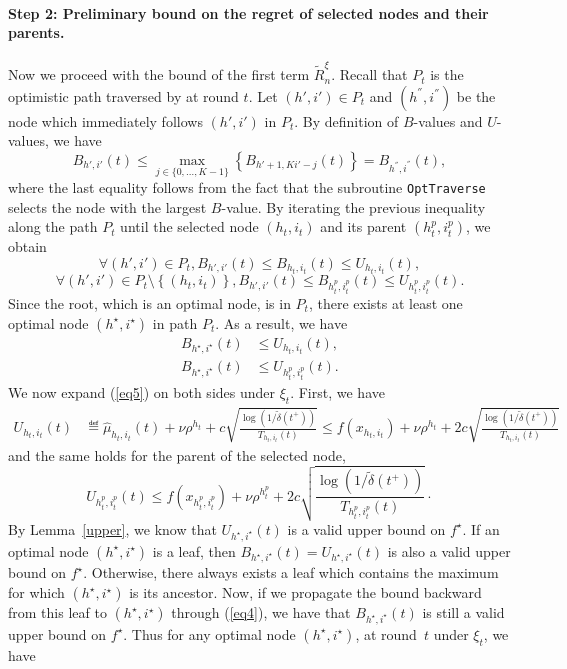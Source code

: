 \paragraph{Step 2: Preliminary bound on the regret of selected nodes and their parents.}
Now we proceed with the bound of the first term $\tilde{R}_n^{\xi}$.
Recall that $P_t$ is the optimistic path traversed by \HCT at round $t$.
Let $(h',i')\in P_t$ and $(h^{''},i^{''})$ be the node which immediately follows $(h',i')$ in $P_t$. By definition of $B$-values and $U$-values, we have
\begin{equation} \label{eq4}
B_{h',i'}(t) \leq \underset{j\in\{0,\ldots,K-1\}}{\max} \left\{B_{h'+1,Ki'-j}(t)\right\} = B_{h^{''},i^{''}}(t),
\end{equation}
where the last equality follows from the fact that the subroutine \texttt{OptTraverse} selects the node with the largest $B$-value. By iterating the previous inequality along  the path $P_t$ until the selected node $(h_t,i_t)$ and its parent $(h_t^p,i_t^p)$, we obtain
\[
\forall (h',i')\in P_t, B_{h',i'}(t) \leq B_{h_t,i_t}(t) \leq U_{h_t,i_t}(t),
\]
\[
\forall (h',i')\in P_t\setminus \left\{(h_t,i_t)\right\}, B_{h',i'}(t) \leq B_{h_t^p,i_t^p}(t) \leq U_{h_t^p,i_t^p}(t).
\]
Since the root, which is an optimal node, is in $P_t$, there exists at least one optimal node $(h^\star,i^\star)$ in path $P_t$. As a result, we have
\begin{align}
    B_{h^\star,i^\star}(t) & \leq U_{h_t,i_t}(t), \label{eq5} \\
    B_{h^\star,i^\star}(t) & \leq U_{h_t^p,i_t^p}(t). \label{eq6}
\end{align}
We now expand (\ref{eq5}) on both sides under $\xi_t$. First, we have
\begin{align}
    U_{h_t,i_t}(t) & \eqdef \hat{\mu}_{h_t,i_t}(t) + \nu\rho^{h_t} +     c\sqrt{\frac{\operatorname{log}(1/\tilde{\delta}(t^+))}{T_{h_t,i_t}(t)}} %
                   \leq f(x_{h_t,i_t}) + \nu\rho^{h_t} + 2c\sqrt{\frac{\operatorname{log}(1/\tilde{\delta}(t^+))}{T_{h_t,i_t}(t)}} \label{eq8}
\end{align}
and the same holds for the parent of the selected node,
\begin{equation*} %
U_{h_t^p,i_t^p}(t) \leq f(x_{h_t^p,i_t^p}) +\nu\rho^{h_t^p} + 2c\sqrt{\frac{\operatorname{log}(1/\tilde{\delta}(t^+))}{T_{h_t^p,i_t^p}(t)}}\cdot
\end{equation*}
By Lemma~\ref{upper}, we know that $U_{h^\star,i^\star}(t)$ is a valid upper bound on $f^\star$. If an optimal node $(h^\star,i^\star)$ is a leaf, then $B_{h^\star,i^\star}(t)=U_{h^\star,i^\star}(t)$ is also a valid upper bound on $f^\star$. Otherwise, there always exists a leaf which contains the maximum for which $(h^\star,i^\star)$ is its ancestor. Now, if we propagate the bound backward from this leaf to $(h^\star,i^\star)$ through (\ref{eq4}), we have that $B_{h^\star,i^\star}(t)$ is still a valid upper bound on $f^\star$. Thus for any optimal node $(h^\star,i^\star)$, at round~$t$ under $\xi_t$, we have
